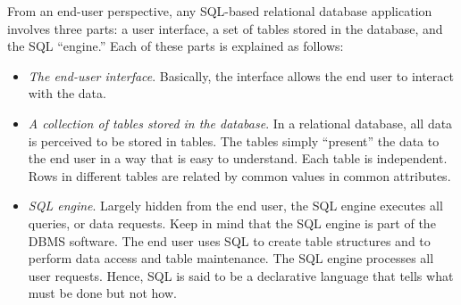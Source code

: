 \documentclass[a4paper, 12pt, titlepage]{report}
\begin{document}
From an end-user perspective, any SQL-based relational database application involves three parts: a user interface, a set of tables stored in the database, and the SQL “engine.” Each of these parts is explained as follows:
\begin{itemize}
\item \emph{The end-user interface}. Basically, the interface allows the end user to interact with the data.
\item \emph{A collection of tables stored in the database}. In a relational database, all data is perceived to be stored in tables. The tables simply “present” the data to the end user in a way that is easy to understand. Each table is independent. Rows in different tables are related by common values in common attributes.
\item \emph{SQL engine}. Largely hidden from the end user, the SQL engine executes all queries, or data requests. Keep in mind that the SQL engine is part of the DBMS software. The end user uses SQL to create table structures and to perform data access and table maintenance. The SQL engine processes all user requests. Hence, SQL is said to be a declarative language that tells what must be done but not how.
\end{itemize}
\end{document}
